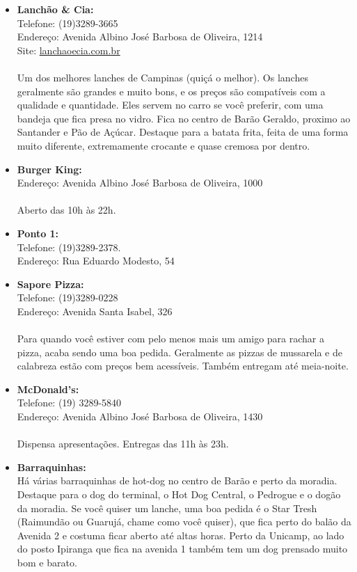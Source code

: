 \begin{itemize}
\item   \textbf{Lanchão \& Cia:}
        \\Telefone: (19)3289-3665
        \\Endereço: Avenida Albino José Barbosa de Oliveira, 1214
        \\Site: \url{lanchaoecia.com.br}
        \\\\Um dos melhores lanches de Campinas (quiçá o melhor). Os lanches
        geralmente são grandes e muito bons, e os preços são compatíveis com a
        qualidade e quantidade. Eles servem no carro se você preferir, com uma
        bandeja que fica presa no vidro. Fica no centro de Barão Geraldo,
        proximo ao Santander e Pão de Açúcar. Destaque para a batata frita,
        feita de uma forma muito diferente, extremamente crocante e quase
        cremosa por dentro.

\item   \textbf{Burger King:}
        \\Endereço: Avenida Albino José Barbosa de Oliveira, 1000
        \\\\Aberto das 10h às 22h.

\item   \textbf{Ponto 1:}
        \\Telefone: (19)3289-2378.
        \\Endereço: Rua Eduardo Modesto, 54

\item   \textbf{Sapore Pizza:}
        \\Telefone: (19)3289-0228
        \\Endereço: Avenida Santa Isabel, 326
        \\\\Para quando você estiver com pelo menos mais um amigo para rachar a
        pizza, acaba sendo uma boa pedida. Geralmente as pizzas de mussarela e
        de calabreza estão com preços bem acessíveis. Também entregam até
        meia-noite.

\item   \textbf{McDonald's:}
        \\Telefone: (19) 3289-5840
        \\Endereço: Avenida Albino José Barbosa de Oliveira, 1430
        \\\\Dispensa apresentações. Entregas das 11h às 23h.

\item   \textbf{Barraquinhas:}
        \\Há várias barraquinhas de hot-dog no centro de Barão e perto da
        moradia. Destaque para o dog do terminal, o Hot Dog Central, o Pedrogue
        e o dogão da moradia. Se você quiser um lanche, uma boa pedida é o Star
        Tresh (Raimundão ou Guarujá, chame como você quiser), que fica perto do
        balão da Avenida 2 e costuma ficar aberto até altas horas. Perto da
        Unicamp, ao lado do posto Ipiranga que fica na avenida 1 também tem um
        dog prensado muito bom e barato.
\end{itemize}

